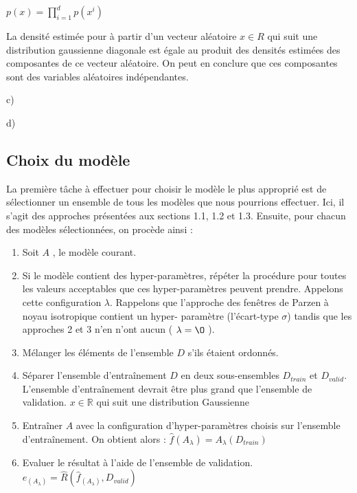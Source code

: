 \documentclass[a4paper,10pt]{article}
\begin{document}
$p(x) = \prod_{i=1}^{d} p(x^{i}) $


La densité estimée pour à partir d'un vecteur aléatoire $x \in R$ qui suit une distribution gaussienne diagonale est égale au produit des densités estimées des composantes de ce vecteur aléatoire. On peut en conclure que ces composantes sont des variables aléatoires indépendantes.


c) 

d) 


\subsection{Choix du modèle}

La première tâche à effectuer pour choisir le modèle le plus approprié est de sélectionner un ensemble de tous les modèles que nous pourrions effectuer. Ici, il s'agit des approches présentées aux sections 1.1, 1.2 et 1.3. Ensuite, pour chacun des modèles sélectionnées, on procède ainsi :

\begin{enumerate}
	\item Soit $A$ , le modèle courant.
	\item Si le modèle contient des hyper-paramètres, répéter la procédure pour toutes les valeurs acceptables que ces hyper-paramètres peuvent prendre. Appelons cette configuration $\lambda$. Rappelons que l'approche des fenêtres de Parzen à noyau isotropique contient un hyper- paramètre (l'écart-type $\sigma$) tandis que les approches 2 et 3 n'en n'ont aucun ( $\lambda= \O$ ).
	\item Mélanger les éléments de l'ensemble $D$ s'ils étaient ordonnés.
	\item Séparer l'ensemble d'entraînement $D$ en deux sous-ensembles $D_{train}$ et $D_{valid}$. L'ensemble d’entraînement devrait être plus grand que l'ensemble de validation. $x \in \mathds{R}$ qui suit une distribution Gaussienne
	\item Entraîner $A$ avec la configuration d'hyper-paramètres choisis sur l'ensemble d'entraînement. On obtient alors : $\widehat{f} (A_{\lambda})=A_{\lambda}(D_{train})$
	\item Evaluer le résultat à l'aide de l'ensemble de validation. $e_{(A_{\lambda})} = \widehat{R} ( \widehat{f}_{(A_{\lambda})} , D_{valid} )$
\end{enumerate}
\end{document}
